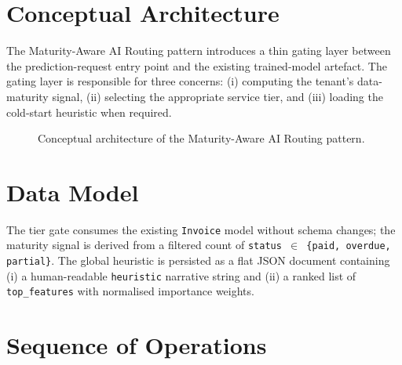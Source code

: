 \section{Conceptual Architecture}
\label{sec:design_concept}

The Maturity-Aware AI Routing pattern introduces a thin gating layer between the prediction-request entry point and the existing trained-model artefact. The gating layer is responsible for three concerns: (i) computing the tenant's data-maturity signal, (ii) selecting the appropriate service tier, and (iii) loading the cold-start heuristic when required.

\begin{figure}[H]
  \centering
  \caption{Conceptual architecture of the Maturity-Aware AI Routing pattern.}
  \label{fig:routing_pattern}
\end{figure}

\section{Data Model}
\label{sec:design_data}

The tier gate consumes the existing \texttt{Invoice} model without schema changes; the maturity signal is derived from a filtered count of \texttt{status~$\in$~\{paid, overdue, partial\}}. The global heuristic is persisted as a flat JSON document containing (i) a human-readable \texttt{heuristic} narrative string and (ii) a ranked list of \texttt{top\_features} with normalised importance weights.

\section{Sequence of Operations}
\label{sec:design_sequence}


